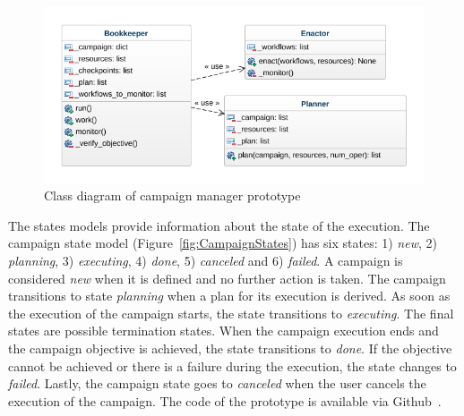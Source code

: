 \begin{figure}[t]
    \centering
    \includegraphics[width=.95\textwidth]{figures/manager/class_diagram.png}
    \caption{Class diagram of campaign manager prototype}\label{fig:rcm_class_diagram}
\end{figure}

The states models provide information about the state of the execution. The 
campaign state model (Figure~\ref{fig:CampaignStates}) has six states: 
1) \textit{new}, 2) \textit{planning}, 3) \textit{executing}, 4) \textit{done}, 
5) \textit{canceled} and 6) \textit{failed}. A campaign is considered 
\textit{new} when it is defined and no further action is taken. The campaign 
transitions to state \textit{planning} when a plan for its execution is 
derived. As soon as the execution of the campaign starts, the state 
transitions to \textit{executing}. The final states are possible termination 
states. When the campaign execution ends and the campaign objective is 
achieved, the state transitions to \textit{done}. If the objective cannot be 
achieved or there is a failure during the execution, the state changes to 
\textit{failed}. Lastly, the campaign state goes to \textit{canceled} when the 
user cancels the execution of the campaign. The code of the prototype is
available via Github~\cite{cm_git}.

